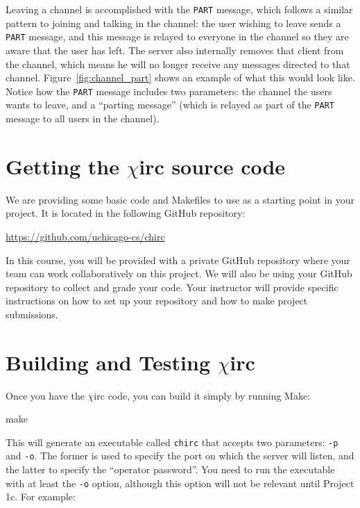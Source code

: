 \documentclass[10pt]{article}
\newcommand{\chirc}{$\chi$\textsf{irc} }
\newenvironment{example}%
{\VerbatimEnvironment\begin{Sbox}\begin{VerbExample}}%
{\end{VerbExample}\end{Sbox}\setlength{\fboxsep}{8pt}\begin{center}\fcolorbox{black}{backgroundgray}{\TheSbox}\end{center}}
\begin{document}
Leaving a channel is accomplished with the \texttt{PART} message, which follows a similar pattern to joining and talking in the channel: the user wishing to leave sends a \texttt{PART} message, and this message is relayed to everyone in the channel so they are aware that the user has left. The server also internally removes that client from the channel, which means he will no longer receive any messages directed to that channel. Figure~\ref{fig:channel_part} shows an example of what this would look like. Notice how the \texttt{PART} message includes two parameters: the channel the users wants to leave, and a ``parting message'' (which is relayed as part of the \texttt{PART} message to all users in the channel).

\section{Getting the \chirc source code}
\label{sec:code}

We are providing some basic code and Makefiles to use as a starting point in your project. It is located in the following GitHub repository:

\begin{center}
\url{https://github.com/uchicago-cs/chirc}
\end{center}

In this course, you will be provided with a private GitHub repository where your team can work collaboratively on this project. We will also be using your GitHub repository to collect and grade your code. Your instructor will provide specific instructions on how to set up your repository and how to make project submissions.


\section{Building and Testing \chirc}
\label{sec:build}

Once you have the \chirc code, you can build it simply by running Make:

\begin{example}
make
\end{example}

This will generate an executable called \texttt{chirc} that accepts two parameters: \texttt{-p} and \texttt{-o}. The former is used to specify the port on which the server will listen, and the latter to specify the ``operator password''. You need to run the executable with at least the \texttt{-o} option, although this option will not be relevant until Project 1c. For example:
\end{document}
